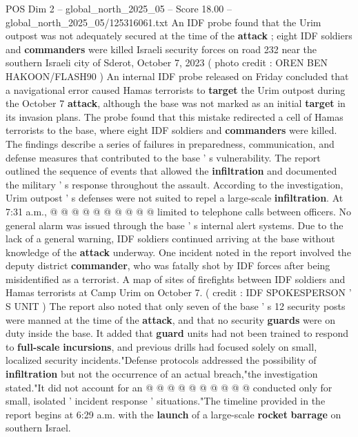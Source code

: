 \begin{textsample}{POS Dim 2 – global\_north\_2025\_05 – Score 18.00 – global\_north\_2025\_05/125316061.txt}  \label{ex:f2_pos_410}
An IDF probe found that the Urim outpost was not adequately secured at the time of the \textbf{attack} ; eight IDF soldiers and \textbf{commanders} were killed Israeli security forces on road 232 near the southern Israeli city of Sderot, October 7, 2023 ( photo credit : OREN BEN HAKOON/FLASH90 ) An internal IDF probe released on Friday concluded that a navigational error caused Hamas terrorists to \textbf{target} the Urim outpost during the October 7 \textbf{attack}, although the base was not marked as an initial \textbf{target} in its invasion plans.
The probe found that this mistake redirected a cell of Hamas terrorists to the base, where eight IDF soldiers and \textbf{commanders} were killed.
The findings describe a series of failures in preparedness, communication, and defense measures that contributed to the base ' s vulnerability.
The report outlined the sequence of events that allowed the \textbf{infiltration} and documented the military ' s response throughout the assault.
According to the investigation, Urim outpost ' s defenses were not suited to repel a large-scale \textbf{infiltration}.
At 7:31 a.m., @ @ @ @ @ @ @ @ @ @ limited to telephone calls between officers.
No general alarm was issued through the base ' s internal alert systems.
Due to the lack of a general warning, IDF soldiers continued arriving at the base without knowledge of the \textbf{attack} underway.
One incident noted in the report involved the deputy district \textbf{commander}, who was fatally shot by IDF forces after being misidentified as a terrorist.
A map of sites of firefights between IDF soldiers and Hamas terrorists at Camp Urim on October 7. ( credit : IDF SPOKESPERSON ' S UNIT ) The report also noted that only seven of the base ' s 12 security posts were manned at the time of the \textbf{attack}, and that no security \textbf{guards} were on duty inside the base.
It added that \textbf{guard} units had not been trained to respond to \textbf{full-scale} \textbf{incursions}, and previous drills had focused solely on small, localized security incidents."Defense protocols addressed the possibility of \textbf{infiltration} but not the occurrence of an actual breach,"the investigation stated."It did not account for an @ @ @ @ @ @ @ @ @ @ conducted only for small, isolated ' incident response ' situations."The timeline provided in the report begins at 6:29 a.m. with the \textbf{launch} of a large-scale \textbf{rocket} \textbf{barrage} on southern Israel.

\end{textsample}

